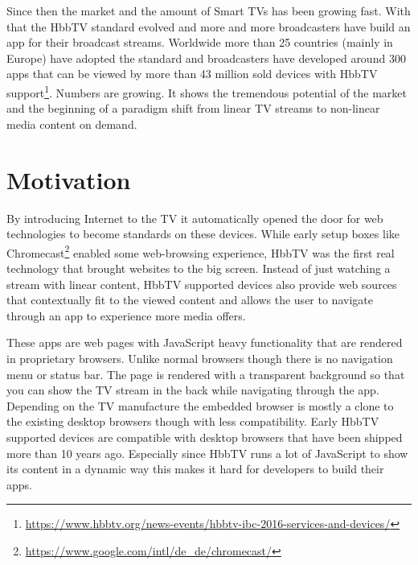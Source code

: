 Since then the market and the amount of Smart TVs has been growing fast. With that the HbbTV standard evolved and more and more broadcasters have build an app for their broadcast streams. Worldwide more than 25 countries (mainly in Europe) have adopted the standard and broadcasters have developed around 300 apps that can be viewed by more than 43 million sold devices with HbbTV support\footnote{\url{https://www.hbbtv.org/news-events/hbbtv-ibc-2016-services-and-devices/}}. Numbers are growing. It shows the tremendous potential of the market and the beginning of a paradigm shift from linear TV streams to non-linear media content on demand.

\section{Motivation\label{sec:motivation}}

By introducing Internet to the TV it automatically opened the door for web technologies to become standards on these devices. While early setup boxes like Chromecast\footnote{\url{https://www.google.com/intl/de_de/chromecast/}} enabled some web-browsing experience, HbbTV was the first real technology that brought websites to the big screen. Instead of just watching a stream with linear content, HbbTV supported devices also provide web sources that contextually fit to the viewed content and allows the user to navigate through an app to experience more media offers.

These apps are web pages with JavaScript heavy functionality that are rendered in proprietary browsers. Unlike normal browsers though there is no navigation menu or status bar. The page is rendered with a transparent background so that you can show the TV stream in the back while navigating through the app. Depending on the TV manufacture the embedded browser is mostly a clone to the existing desktop browsers though with less compatibility. Early HbbTV supported devices are compatible with desktop browsers that have been shipped more than 10 years ago. Especially since HbbTV runs a lot of JavaScript to show its content in a dynamic way this makes it hard for developers to build their apps.

